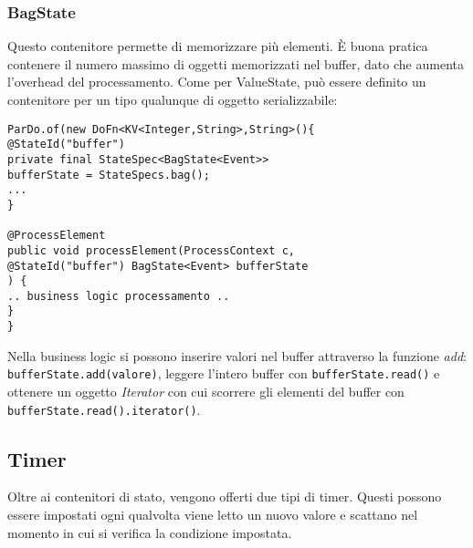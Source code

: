 \subsubsection{BagState}
Questo contenitore permette di memorizzare più elementi. È buona pratica contenere il numero massimo di oggetti memorizzati nel buffer, dato che aumenta l'overhead del processamento. Come per ValueState, può essere definito un contenitore per un tipo qualunque di oggetto serializzabile:
\begin{lstlisting}
ParDo.of(new DoFn<KV<Integer,String>,String>(){
@StateId("buffer")
private final StateSpec<BagState<Event>> 
bufferState = StateSpecs.bag();
...
}

@ProcessElement
public void processElement(ProcessContext c,
@StateId("buffer") BagState<Event> bufferState
) {
.. business logic processamento ..
}
}	
\end{lstlisting}
Nella business logic si possono inserire valori nel buffer attraverso la funzione \textit{add}: \texttt{bufferState\allowbreak.add(valore)}, leggere l'intero buffer con \texttt{bufferState\allowbreak.read()} e ottenere un oggetto \textit{Iterator} con cui scorrere gli elementi del buffer con \texttt{\allowbreak bufferState\allowbreak.read()\allowbreak.iterator()}.
\subsection{Timer}\label{statefultimers}
Oltre ai contenitori di stato, vengono offerti due tipi di timer. Questi possono essere impostati ogni qualvolta viene letto un nuovo valore e scattano nel momento in cui si verifica la condizione impostata.
